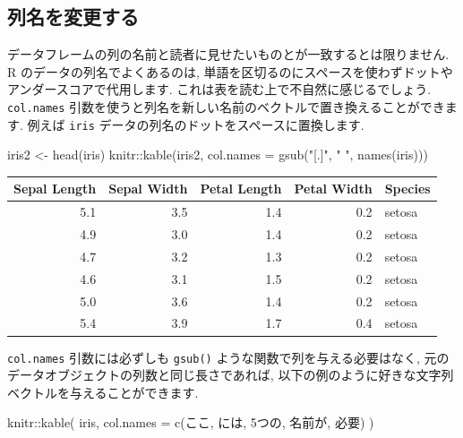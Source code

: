 \documentclass[
  11pt,
  lualatex,
  ja=standard]{bxjsreport}
\newenvironment{Shaded}{\begin{snugshade}}{\end{snugshade}}
\newcommand{\AttributeTok}[1]{\textcolor[rgb]{0.77,0.63,0.00}{#1}}
\newcommand{\FunctionTok}[1]{\textcolor[rgb]{0.00,0.00,0.00}{#1}}
\newcommand{\NormalTok}[1]{#1}
\newcommand{\OtherTok}[1]{\textcolor[rgb]{0.56,0.35,0.01}{#1}}
\newcommand{\SpecialCharTok}[1]{\textcolor[rgb]{0.00,0.00,0.00}{#1}}
\newcommand{\StringTok}[1]{\textcolor[rgb]{0.31,0.60,0.02}{#1}}
\begin{document}
\hypertarget{change-column-names}{%
\subsection{列名を変更する}\label{change-column-names}}

データフレームの列の名前と読者に見せたいものとが一致するとは限りません. R のデータの列名でよくあるのは, 単語を区切るのにスペースを使わずドットやアンダースコアで代用します. これは表を読む上で不自然に感じるでしょう. \texttt{col.names} 引数を使うと列名を新しい名前のベクトルで置き換えることができます. 例えば \texttt{iris} データの列名のドットをスペースに置換します.

\begin{Shaded}
\begin{Highlighting}[numbers=left,,]
\NormalTok{iris2 }\OtherTok{\textless{}{-}} \FunctionTok{head}\NormalTok{(iris)}
\NormalTok{knitr}\SpecialCharTok{::}\FunctionTok{kable}\NormalTok{(iris2, }\AttributeTok{col.names =} \FunctionTok{gsub}\NormalTok{(}\StringTok{"[.]"}\NormalTok{, }\StringTok{" "}\NormalTok{, }\FunctionTok{names}\NormalTok{(iris)))}
\end{Highlighting}
\end{Shaded}

\begin{tabular}{r|r|r|r|l}
\hline
Sepal Length & Sepal Width & Petal Length & Petal Width & Species\\
\hline
5.1 & 3.5 & 1.4 & 0.2 & setosa\\
\hline
4.9 & 3.0 & 1.4 & 0.2 & setosa\\
\hline
4.7 & 3.2 & 1.3 & 0.2 & setosa\\
\hline
4.6 & 3.1 & 1.5 & 0.2 & setosa\\
\hline
5.0 & 3.6 & 1.4 & 0.2 & setosa\\
\hline
5.4 & 3.9 & 1.7 & 0.4 & setosa\\
\hline
\end{tabular}

\texttt{col.names} 引数には必ずしも \texttt{gsub()} ような関数で列を与える必要はなく, 元のデータオブジェクトの列数と同じ長さであれば, 以下の例のように好きな文字列ベクトルを与えることができます.

\begin{Shaded}
\begin{Highlighting}[numbers=left,,]
\NormalTok{knitr}\SpecialCharTok{::}\FunctionTok{kable}\NormalTok{(}
\NormalTok{  iris,}
  \AttributeTok{col.names =} \FunctionTok{c}\NormalTok{(}\StringTok{\textquotesingle{}ここ\textquotesingle{}}\NormalTok{, }\StringTok{\textquotesingle{}には\textquotesingle{}}\NormalTok{, }\StringTok{\textquotesingle{}5つの\textquotesingle{}}\NormalTok{, }\StringTok{\textquotesingle{}名前が\textquotesingle{}}\NormalTok{, }\StringTok{\textquotesingle{}必要\textquotesingle{}}\NormalTok{)}
\NormalTok{)}
\end{Highlighting}
\end{Shaded}
\end{document}
